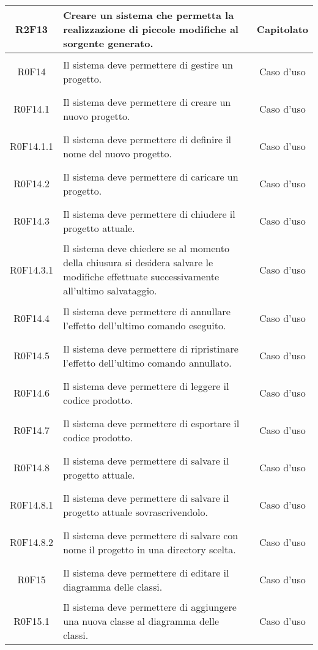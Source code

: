 \documentclass[../AnalisiDeiRequisiti.tex]{subfiles}
\begin{document}
\begin{longtable}{|c|>{\centering}p{7cm}|c|}
	\hypertarget{R2F13}{R2F13} & Creare un sistema che permetta la realizzazione di piccole modifiche al sorgente generato. & Capitolato \\ \hline
	\hypertarget{R0F14}{R0F14} & Il sistema deve permettere di gestire un progetto. & Caso d'uso \\ \hline
	\hypertarget{R0F14.1}{R0F14.1} & Il sistema deve permettere di creare un nuovo progetto. & Caso d'uso \\ \hline
	\hypertarget{R0F14.1.1}{R0F14.1.1} & Il sistema deve permettere di definire il nome del nuovo progetto. & Caso d'uso \\ \hline
	\hypertarget{R0F14.2}{R0F14.2} & Il sistema deve permettere di caricare un progetto.

& Caso d'uso \\ \hline
\hypertarget{R0F14.3}{R0F14.3} & Il sistema deve permettere di chiudere il progetto attuale. & Caso d'uso \\ \hline
\hypertarget{R0F14.3.1}{R0F14.3.1} & Il sistema deve chiedere se al momento della chiusura si desidera  salvare le modifiche effettuate successivamente all'ultimo salvataggio. & Caso d'uso \\ \hline
\hypertarget{R0F14.4}{R0F14.4} & Il sistema deve permettere di annullare l'effetto dell'ultimo comando eseguito. & Caso d'uso \\ \hline
\hypertarget{R0F14.5}{R0F14.5} & Il sistema deve permettere di ripristinare l'effetto dell'ultimo comando annullato. & Caso d'uso \\ \hline
\hypertarget{R0F14.6}{R0F14.6} & Il sistema deve permettere di leggere il codice prodotto. & Caso d'uso \\ \hline
\hypertarget{R0F14.7}{R0F14.7} & Il sistema deve permettere di esportare il codice prodotto. & Caso d'uso \\ \hline
\hypertarget{R0F14.8}{R0F14.8} & Il sistema deve permettere di salvare il progetto attuale. & Caso d'uso \\ \hline
\hypertarget{R0F14.8.1}{R0F14.8.1} & Il sistema deve permettere di salvare il progetto attuale sovrascrivendolo. & Caso d'uso \\ \hline
\hypertarget{R0F14.8.2}{R0F14.8.2} & Il sistema deve permettere di salvare con nome il progetto in una directory scelta. & Caso d'uso \\ \hline
\hypertarget{R0F15}{R0F15} & Il sistema deve permettere di editare il diagramma delle classi. & Caso d'uso \\ \hline
\hypertarget{R0F15.1}{R0F15.1} & Il sistema deve permettere di aggiungere una nuova classe al diagramma delle classi. & Caso d'uso \\ \hline

\end{longtable}
\end{document}
